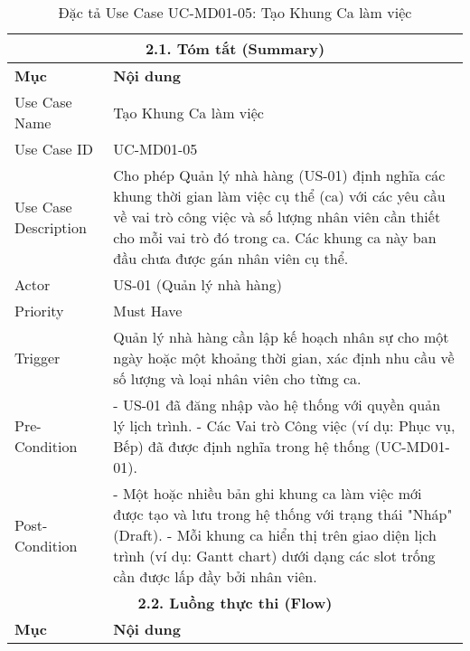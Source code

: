 \begin{longtable}{|m{4cm}|p{11cm}|}
\caption{Đặc tả Use Case UC-MD01-05: Tạo Khung Ca làm việc} \label{tab:uc_md01_05_revised} \\
\hline
\multicolumn{2}{|c|}{\textbf{2.1. Tóm tắt (Summary)}} \\
\hline
\textbf{Mục} & \textbf{Nội dung} \\
\hline
\endhead %
\hline
\endfoot %
\hline
\endlastfoot %
Use Case Name & Tạo Khung Ca làm việc \\
\hline
Use Case ID & UC-MD01-05 \\
\hline
Use Case Description & Cho phép Quản lý nhà hàng (US-01) định nghĩa các khung thời gian làm việc cụ thể (ca) với các yêu cầu về vai trò công việc và số lượng nhân viên cần thiết cho mỗi vai trò đó trong ca. Các khung ca này ban đầu chưa được gán nhân viên cụ thể. \\
\hline
Actor & US-01 (Quản lý nhà hàng) \\
\hline
Priority & Must Have \\
\hline
Trigger & Quản lý nhà hàng cần lập kế hoạch nhân sự cho một ngày hoặc một khoảng thời gian, xác định nhu cầu về số lượng và loại nhân viên cho từng ca. \\
\hline
Pre-Condition & - US-01 đã đăng nhập vào hệ thống với quyền quản lý lịch trình. \newline - Các Vai trò Công việc (ví dụ: Phục vụ, Bếp) đã được định nghĩa trong hệ thống (UC-MD01-01). \\
\hline
Post-Condition & - Một hoặc nhiều bản ghi khung ca làm việc mới được tạo và lưu trong hệ thống với trạng thái "Nháp" (Draft). \newline - Mỗi khung ca hiển thị trên giao diện lịch trình (ví dụ: Gantt chart) dưới dạng các slot trống cần được lấp đầy bởi nhân viên. \\
\hline
\multicolumn{2}{|c|}{\textbf{2.2. Luồng thực thi (Flow)}} \\
\hline
\textbf{Mục} & \textbf{Nội dung} \\
\hline

\end{longtable}
